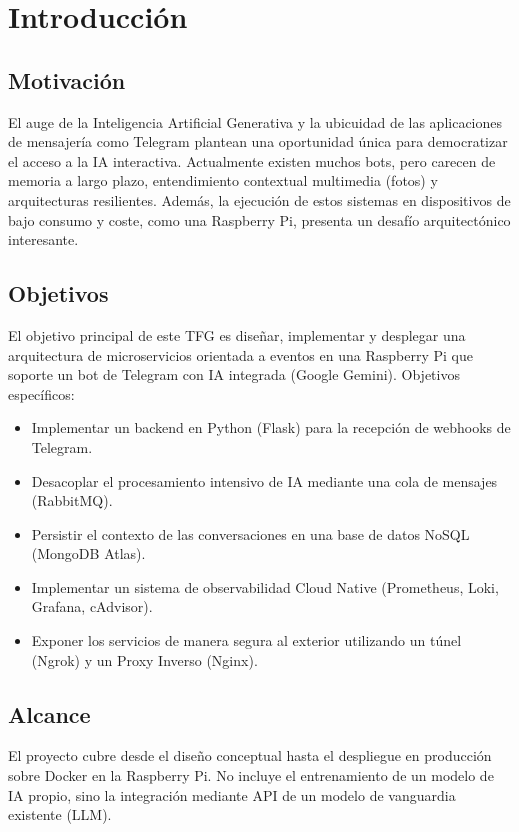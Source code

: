 \section{Introducción}
\label{sec:introduccion}

\subsection{Motivación}
El auge de la Inteligencia Artificial Generativa y la ubicuidad de las aplicaciones de mensajería como Telegram plantean una oportunidad única para democratizar el acceso a la IA interactiva.
Actualmente existen muchos bots, pero carecen de memoria a largo plazo, entendimiento contextual multimedia (fotos) y arquitecturas resilientes.
Además, la ejecución de estos sistemas en dispositivos de bajo consumo y coste, como una Raspberry Pi, presenta un desafío arquitectónico interesante.

\subsection{Objetivos}
El objetivo principal de este TFG es diseñar, implementar y desplegar una arquitectura de microservicios orientada a eventos en una Raspberry Pi que soporte un bot de Telegram con IA integrada (Google Gemini).
Objetivos específicos:
\begin{itemize}
    \item Implementar un backend en Python (Flask) para la recepción de webhooks de Telegram.
    \item Desacoplar el procesamiento intensivo de IA mediante una cola de mensajes (RabbitMQ).
    \item Persistir el contexto de las conversaciones en una base de datos NoSQL (MongoDB Atlas).
    \item Implementar un sistema de observabilidad Cloud Native (Prometheus, Loki, Grafana, cAdvisor).
    \item Exponer los servicios de manera segura al exterior utilizando un túnel (Ngrok) y un Proxy Inverso (Nginx).
\end{itemize}

\subsection{Alcance}
El proyecto cubre desde el diseño conceptual hasta el despliegue en producción sobre Docker en la Raspberry Pi. No incluye el entrenamiento de un modelo de IA propio, sino la integración mediante API de un modelo de vanguardia existente (LLM).
